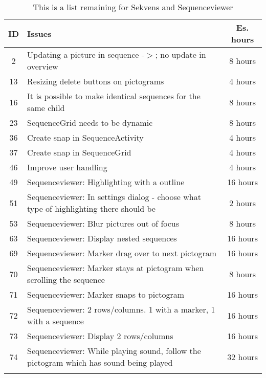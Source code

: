 \begin{longtable} { | c | p{12cm} | c | } 
\hline
	ID 	&	Issues	&	 Es. hours \\\hline
	2	& 	Updating a picture in sequence -$>$; no update in overview	& 	8 hours  \\\hline
	13	& 	Resizing delete buttons on pictograms	& 	4 hours  \\\hline
	16	& 	It is possible to make identical sequences for the same child	& 	8 hours  \\\hline
	23	& 	SequenceGrid needs to be dynamic	& 	8 hours  \\\hline
	36	& 	Create snap in SequenceActivity	& 	4 hours  \\\hline
	37	& 	Create snap in SequenceGrid	& 	4 hours  \\\hline
	46	& 	Improve user handling 	& 	4 hours  \\\hline
	49	& 	Sequenceviewer: Highlighting with a outline 	& 	16 hours  \\\hline
	51	& 	Sequenceviewer: In settings dialog - choose what type of highlighting there should be	& 	2 hours  \\\hline
	53	& 	Sequenceviewer: Blur pictures out of focus	& 	8 hours  \\\hline
	63	& 	Sequenceviewer: Display nested sequences 	& 	16 hours  \\\hline
	69	& 	Sequenceviewer: Marker drag over to next pictogram 	& 	16 hours  \\\hline
	70	& 	Sequenceviewer: Marker stays at pictogram when scrolling the sequence 	& 	8 hours  \\\hline
	71	& 	Sequenceviewer: Marker snaps to pictogram 	& 	16 hours  \\\hline
	72	& 	Sequenceviewer: 2 rows/columns. 1 with a marker, 1 with a sequence 	& 	16 hours  \\\hline
	73	& 	Sequenceviewer: Display 2 rows/columns 	& 	16 hours  \\\hline
	74	& 	Sequenceviewer: While playing sound, follow the pictogram which has sound being played 	& 	32 hours  \\\hline
\caption{This is a list remaining for Sekvens and Sequenceviewer}
\label{tab:remaining_prodblog}
\end{longtable}


